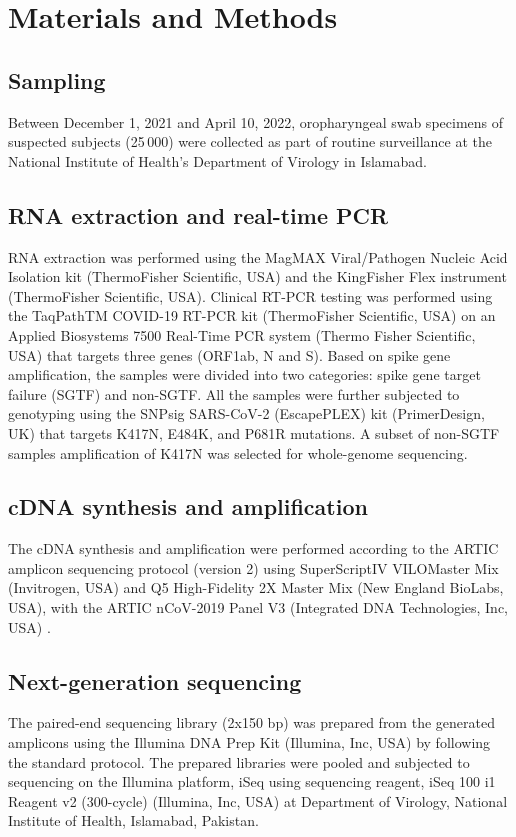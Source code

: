 \section{Materials and Methods}\label{sec-mm}

\subsection{Sampling}\label{2:mm-sampling}
Between December 1, 2021 and April 10, 2022, oropharyngeal swab specimens of suspected subjects (25\,000) were collected as part of routine surveillance at the National Institute of Health's Department of Virology in Islamabad.


\subsection{RNA extraction and real-time PCR}\label{2:mm-pcr}
RNA extraction was performed using the MagMAX Viral/Pathogen Nucleic Acid Isolation kit (ThermoFisher Scientific, USA) and the KingFisher Flex instrument (ThermoFisher Scientific, USA).
Clinical RT-PCR testing was performed using the TaqPathTM COVID-19 RT-PCR kit (ThermoFisher Scientific, USA) on an Applied Biosystems 7500 Real-Time PCR system (Thermo Fisher Scientific, USA) that targets three genes (ORF1ab, N and S).
Based on spike gene amplification, the samples were divided into two categories: spike gene target failure (SGTF) and non-SGTF.
All the samples were further subjected to genotyping using the SNPsig\textsuperscript{\textregistered} SARS-CoV-2 (EscapePLEX) kit (PrimerDesign, UK) that targets K417N, E484K, and P681R mutations.
A subset of non-SGTF samples amplification of K417N was selected for whole-genome sequencing.


\subsection{cDNA synthesis and amplification }\label{2:mm-amp}
The cDNA synthesis and amplification were performed according to the ARTIC amplicon sequencing protocol (version 2) using SuperScript\texttrademark IV VILO\texttrademark Master Mix (Invitrogen, USA) and Q5\textsuperscript{\textregistered} High-Fidelity 2X Master Mix (New England BioLabs, USA), with the ARTIC nCoV-2019 Panel V3 (Integrated DNA Technologies, Inc, USA) \cite{quick2020ncov}.


\subsection{Next-generation sequencing}\label{2:mm-seq}
The paired-end sequencing library (2x150 bp) was prepared from the generated amplicons using the Illumina DNA Prep Kit (Illumina, Inc, USA) by following the standard protocol.
The prepared libraries were pooled and subjected to sequencing on the Illumina platform, iSeq using sequencing reagent, iSeq 100 i1 Reagent v2 (300-cycle) (Illumina, Inc, USA) at Department of Virology, National Institute of Health, Islamabad, Pakistan.


